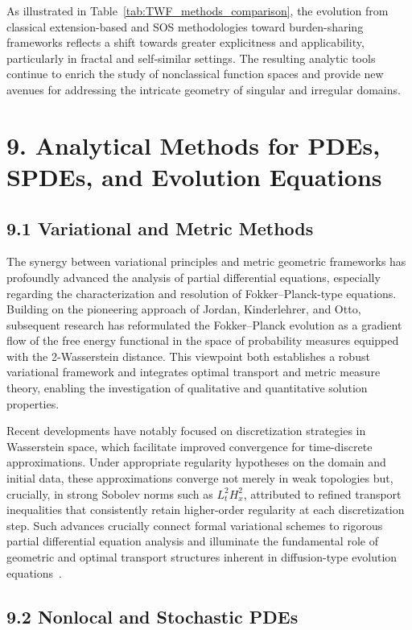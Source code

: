 \documentclass[11pt]{article}
\begin{document}
As illustrated in Table~\ref{tab:TWF_methods_comparison}, the evolution from classical extension-based and SOS methodologies toward burden-sharing frameworks reflects a shift towards greater explicitness and applicability, particularly in fractal and self-similar settings. The resulting analytic tools continue to enrich the study of nonclassical function spaces and provide new avenues for addressing the intricate geometry of singular and irregular domains.

\section{9. Analytical Methods for PDEs, SPDEs, and Evolution Equations}

\subsection{9.1 Variational and Metric Methods}

The synergy between variational principles and metric geometric frameworks has profoundly advanced the analysis of partial differential equations, especially regarding the characterization and resolution of Fokker–Planck-type equations. Building on the pioneering approach of Jordan, Kinderlehrer, and Otto, subsequent research has reformulated the Fokker–Planck evolution as a gradient flow of the free energy functional in the space of probability measures equipped with the 2-Wasserstein distance. This viewpoint both establishes a robust variational framework and integrates optimal transport and metric measure theory, enabling the investigation of qualitative and quantitative solution properties. 

Recent developments have notably focused on discretization strategies in Wasserstein space, which facilitate improved convergence for time-discrete approximations. Under appropriate regularity hypotheses on the domain and initial data, these approximations converge not merely in weak topologies but, crucially, in strong Sobolev norms such as $L^2_t H^2_x$, attributed to refined transport inequalities that consistently retain higher-order regularity at each discretization step. Such advances crucially connect formal variational schemes to rigorous partial differential equation analysis and illuminate the fundamental role of geometric and optimal transport structures inherent in diffusion-type evolution equations~\cite{ref96}.

\subsection{9.2 Nonlocal and Stochastic PDEs}
\end{document}
